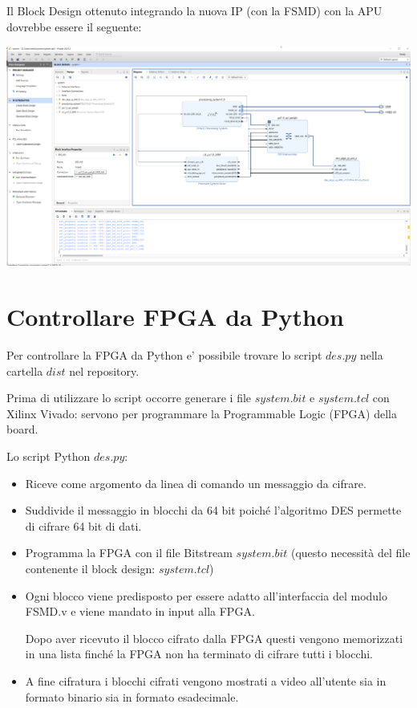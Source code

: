 \documentclass[a4paper]{article}
\begin{document}
Il Block Design ottenuto integrando la nuova IP (con la FSMD) con la APU dovrebbe essere il seguente:

\includegraphics[width=6in]{assets/block_diagram.png}

\section{Controllare FPGA da Python}

Per controllare la FPGA da Python e' possibile trovare lo script $des.py$ nella cartella $dist$ nel repository.


Prima di utilizzare lo script occorre generare i file $system.bit$ e $system.tcl$ con Xilinx Vivado: servono per programmare la Programmable Logic (FPGA) della board.

Lo script Python $des.py$:
\begin{itemize}
    \item Riceve come argomento da linea di comando un messaggio da cifrare.
    \item Suddivide il messaggio in blocchi da 64 bit poiché l'algoritmo DES permette di cifrare 64 bit di dati.

    \item Programma la FPGA con il file Bitstream $system.bit$ (questo necessità del file contenente il block design: $system.tcl$)
    \item Ogni blocco viene predisposto per essere adatto all'interfaccia del modulo FSMD.v e viene mandato in input alla FPGA.

          Dopo aver ricevuto il blocco cifrato dalla FPGA questi vengono memorizzati in una lista finché la FPGA non ha terminato di cifrare tutti i blocchi.
    \item A fine cifratura i blocchi cifrati vengono mostrati a video all'utente sia in formato binario sia in formato esadecimale.
\end{itemize}
\end{document}
